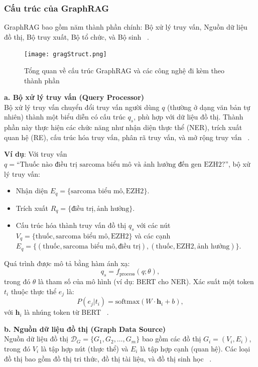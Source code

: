 \documentclass[a4paper]{article}
\begin{document}
\subsubsection{Cấu trúc của GraphRAG}
GraphRAG bao gồm năm thành phần chính: Bộ xử lý truy vấn, Nguồn dữ liệu đồ thị, Bộ truy xuất, Bộ tổ chức, và Bộ sinh ~\cite{Chen2024GraphRAG}.
\begin{figure}[H]
    \centering
    \texttt{[image: gragStruct.png]}
    \caption{Tổng quan về cấu trúc GraphRAG và các công nghệ đi kèm theo thành phần}

\end{figure}
\textbf{a.  Bộ xử lý truy vấn (Query Processor)}\\
Bộ xử lý truy vấn chuyển đổi truy vấn người dùng $q$ (thường ở dạng văn bản tự nhiên) thành một biểu diễn có cấu trúc $q_s$, phù hợp với dữ liệu đồ thị. Thành phần này thực hiện các chức năng như nhận diện thực thể (NER), trích xuất quan hệ (RE), cấu trúc hóa truy vấn, phân rã truy vấn, và mở rộng truy vấn ~\cite{Devlin2019BERT}.

\textbf{Ví dụ}: Với truy vấn $q = \text{``Thuốc nào điều trị sarcoma biểu mô và ảnh hưởng đến gen EZH2?''}$, bộ xử lý truy vấn:
\begin{itemize}
    \item Nhận diện $E_q = \{\text{sarcoma biểu mô}, \text{EZH2}\}$.
    \item Trích xuất $R_q = \{\text{điều trị}, \text{ảnh hưởng}\}$.
    \item Cấu trúc hóa thành truy vấn đồ thị $q_s$ với các nút $V_q = \{\text{thuốc}, \text{sarcoma biểu mô}, \text{EZH2}\}$ và các cạnh $E_q = \{(\text{thuốc}, \text{sarcoma biểu mô}, \text{điều trị}), (\text{thuốc}, \text{EZH2}, \text{ảnh hưởng})\}$.
\end{itemize}

Quá trình được mô tả bằng hàm ánh xạ:
\begin{equation}
    q_s = f_{\text{process}}(q; \theta),
\end{equation}
trong đó $\theta$ là tham số của mô hình (ví dụ: BERT cho NER). Xác suất một token $t_i$ thuộc thực thể $e_j$ là:
\begin{equation}
    P(e_j | t_i) = \text{softmax}(W \cdot \mathbf{h}_i + b),
\end{equation}
với $\mathbf{h}_i$ là nhúng token từ BERT ~\cite{Devlin2019BERT}.

\textbf{b.  Nguồn dữ liệu đồ thị (Graph Data Source)}\\
Nguồn dữ liệu đồ thị $\mathcal{D}_G = \{G_1, G_2, \dots, G_m\}$ bao gồm các đồ thị $G_i = (V_i, E_i)$, trong đó $V_i$ là tập hợp nút (thực thể) và $E_i$ là tập hợp cạnh (quan hệ). Các loại đồ thị bao gồm đồ thị tri thức, đồ thị tài liệu, và đồ thị sinh học ~\cite{Liu2023GraphSurvey}.
\end{document}
